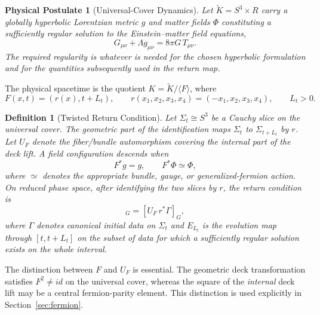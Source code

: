 \documentclass[11pt]{article}
\theoremstyle{canonmath}
\newtheorem{definition}[theorem]{Definition}
\theoremstyle{canonpostulate}
\newtheorem{postulate}{Physical Postulate}[section]
\theoremstyle{canonclaim}
\providecommand{\Klein}{\mathcal{K}}
\providecommand{\R}{\mathbb{R}}
\providecommand{\Sthree}{S^3}
\providecommand{\id}{\mathrm{id}}
\def\mathrm#1{#1}%
\def\mathbb#1{#1}%
\def\mathcal#1{#1}%
\begin{document}
\begin{postulate}[Universal-Cover Dynamics] \label{post:cover}
Let $\widetilde{\Klein}=\Sthree\times\R$ carry a globally hyperbolic Lorentzian metric $g$ and matter fields $\Phi$ constituting a sufficiently regular solution to the Einstein--matter field equations,
\begin{equation}
G_{\mu\nu}+\Lambda g_{\mu\nu}=8\pi G\,T_{\mu\nu}.
\end{equation}
The required regularity is whatever is needed for the chosen hyperbolic formulation and for the quantities subsequently used in the return map.
\end{postulate}

The physical spacetime is the quotient $\Klein=\widetilde{\Klein}/\langle F\rangle$, where
\begin{equation}
F(x,t)=(r(x),t+L_t),
\qquad
r(x_1,x_2,x_3,x_4)=(-x_1,x_2,x_3,x_4),
\qquad L_t>0.
\end{equation}

\begin{definition}[Twisted Return Condition] \label{def:twisted}
Let $\Sigma_t\cong\Sthree$ be a Cauchy slice on the universal cover. The geometric part of the identification maps $\Sigma_t$ to $\Sigma_{t+L_t}$ by $r$. Let $U_F$ denote the fiber/bundle automorphism covering the internal part of the deck lift. A field configuration descends when
\begin{equation}
F^*g=g,
\qquad
F^*\Phi\simeq\Phi,
\end{equation}
where $\simeq$ denotes the appropriate bundle, gauge, or generalized-fermion action. On reduced phase space, after identifying the two slices by $r$, the return condition is
\begin{equation}
[\mathcal E_{L_t}(\Gamma)]_{\mathcal G}
=
[U_F\,r^*\Gamma]_{\mathcal G},
\label{eq:canonical_period}
\end{equation}
where $\Gamma$ denotes canonical initial data on $\Sigma_t$ and $\mathcal E_{L_t}$ is the evolution map through $[t,t+L_t]$ on the subset of data for which a sufficiently regular solution exists on the whole interval.
\end{definition}

The distinction between $F$ and $U_F$ is essential. The geometric deck transformation satisfies $F^2\neq\id$ on the universal cover, whereas the square of the \emph{internal} deck lift may be a central fermion-parity element. This distinction is used explicitly in Section~\ref{sec:fermion}.
\end{document}
